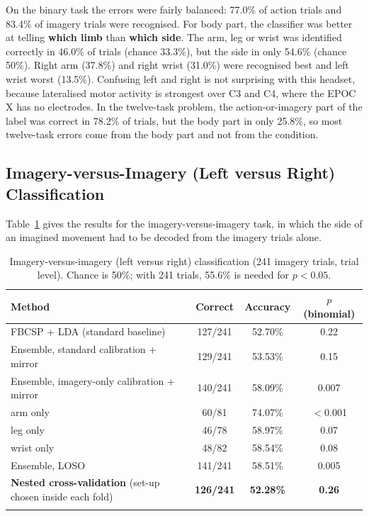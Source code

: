 \documentclass[pdflatex,sn-mathphys-num]{sn-jnl}%
\theoremstyle{thmstyleone}%
\theoremstyle{thmstyletwo}%
\theoremstyle{thmstylethree}%
\begin{document}
On the binary task the errors were fairly balanced: 77.0\% of action trials and 83.4\% of imagery trials were recognised. For body part, the classifier was better at telling \textbf{which limb} than \textbf{which side}. The arm, leg or wrist was identified correctly in 46.0\% of trials (chance 33.3\%), but the side in only 54.6\% (chance 50\%). Right arm (37.8\%) and right wrist (31.0\%) were recognised best and left wrist worst (13.5\%). Confusing left and right is not surprising with this headset, because lateralised motor activity is strongest over C3 and C4, where the EPOC X has no electrodes. In the twelve-task problem, the action-or-imagery part of the label was correct in 78.2\% of trials, but the body part in only 25.8\%, so most twelve-task errors come from the body part and not from the condition.

\subsection{Imagery-versus-Imagery (Left versus Right) Classification}\label{subsec:lrresults}

Table~\ref{tab:lr} gives the results for the imagery-versus-imagery task, in which the side of an imagined movement had to be decoded from the imagery trials alone.

\begin{table}[htbp]
\centering
\caption{Imagery-versus-imagery (left versus right) classification (241 imagery trials, trial level). Chance is 50\%; with 241 trials, 55.6\% is needed for $p < 0.05$.}
\label{tab:lr}
\footnotesize
\begin{tabular}{@{}lccc@{}}
\toprule
\textbf{Method} & \textbf{Correct} & \textbf{Accuracy} & \textbf{$p$ (binomial)} \\
\midrule
FBCSP + LDA (standard baseline) & 127/241 & 52.70\% & 0.22 \\
Ensemble, standard calibration + mirror & 129/241 & 53.53\% & 0.15 \\
Ensemble, imagery-only calibration + mirror & 140/241 & 58.09\% & 0.007 \\
\quad arm only & 60/81 & 74.07\% & $<$0.001 \\
\quad leg only & 46/78 & 58.97\% & 0.07 \\
\quad wrist only & 48/82 & 58.54\% & 0.08 \\
Ensemble, LOSO & 141/241 & 58.51\% & 0.005 \\
\midrule
\textbf{Nested cross-validation} (set-up chosen inside each fold) & \textbf{126/241} & \textbf{52.28\%} & \textbf{0.26} \\
\botrule
\end{tabular}
\end{table}
\end{document}
